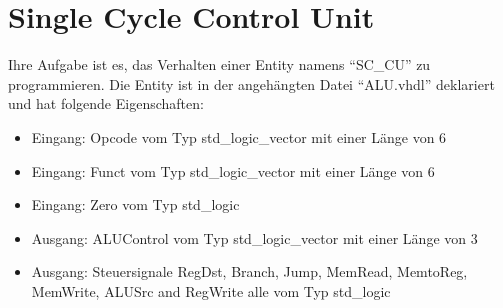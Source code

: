 \documentclass[a4paper,12pt]{article}
\begin{document}
\pagestyle{empty}
\setlength{\parindent}{0em}
\section*{Single Cycle Control Unit}

Ihre Aufgabe ist es, das Verhalten einer Entity  namens "`SC\_CU"' zu programmieren. Die Entity ist in der angeh\"angten Datei "`ALU.vhdl"' deklariert und hat folgende Eigenschaften:
\begin{itemize}
\item Eingang:  Opcode vom Typ std\_logic\_vector mit einer L\"ange von 6
\item Eingang:  Funct vom Typ std\_logic\_vector mit einer L\"ange von 6
\item Eingang:  Zero vom Typ std\_logic
\item Ausgang: ALUControl vom Typ std\_logic\_vector mit einer L\"ange von 3
\item Ausgang: Steuersignale RegDst, Branch, Jump, MemRead, MemtoReg, MemWrite, ALUSrc and RegWrite alle vom Typ std\_logic
\end{itemize}
\end{document}

